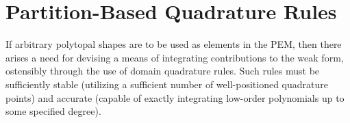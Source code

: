 



\section{Partition-Based Quadrature Rules} \label{sec:quadrature}

		
If arbitrary polytopal shapes are to be used as elements in the PEM, then there arises a need for devising a means of integrating contributions to the weak form, ostensibly through the use of domain quadrature rules. Such rules must be sufficiently stable (utilizing a sufficient number of well-positioned quadrature points) and accurate (capable of exactly integrating low-order polynomials up to some specified degree).
	
